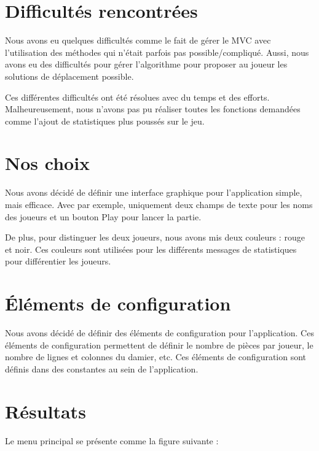 \section{Difficultés rencontrées}

Nous avons eu quelques difficultés comme le fait de gérer le MVC avec l'utilisation des méthodes
qui n'était parfois pas possible/compliqué. Aussi, nous avons eu des difficultés pour gérer l'algorithme 
pour proposer au joueur les solutions de déplacement possible.\medskip

Ces différentes difficultés ont été résolues avec du temps et des efforts.
Malheureusement, nous n'avons pas pu réaliser toutes les fonctions demandées comme 
l'ajout de statistiques plus poussés sur le jeu.


\section{Nos choix}

Nous avons décidé de définir une interface graphique pour l'application simple, mais efficace.
Avec par exemple, uniquement deux champs de texte pour les noms des joueurs et un bouton Play pour lancer la partie.\medskip

De plus, pour distinguer les deux joueurs, nous avons mis deux couleurs : rouge et noir.
Ces couleurs sont utilisées pour les différents messages de statistiques pour différentier les joueurs.

\section{Éléments de configuration}

Nous avons décidé de définir des éléments de configuration pour l'application.
Ces éléments de configuration permettent de définir le nombre de pièces par joueur, le nombre de lignes et colonnes du damier, etc.
Ces éléments de configuration sont définis dans des constantes au sein de l'application.

\section{Résultats}

Le menu principal se présente comme la figure suivante :

